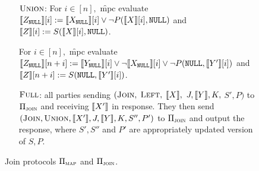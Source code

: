 \begin{figure}
{\begin{minipage}{0.95\linewidth}
\begin{enumerate}[leftmargin=.5cm]
\begin{enumerate}[leftmargin=1.1cm]
					
					\item[$\textsc{Union}$:] 
					For $i\in [n],$ \f{mpc} evaluate $\llbracket Z_\texttt{NULL}\rrbracket[i]:= \llbracket X_\texttt{NULL}\rrbracket[i] \vee \neg P(\llbracket X\rrbracket[i], \texttt{NULL})$ and $\llbracket Z\rrbracket[i]:=S(\llbracket X\rrbracket[i], \texttt{NULL})$. 
					
					For $i\in [n],$ \f{mpc} evaluate $\llbracket Z_\texttt{NULL}\rrbracket[n+i]:= \llbracket Y_\texttt{NULL}\rrbracket[i] \vee \neg \llbracket X_\texttt{NULL}\rrbracket[i] \vee \neg P(\texttt{NULL}, \llbracket Y'\rrbracket[i])$ and $\llbracket Z\rrbracket[n+i]:=S(\texttt{NULL}, \llbracket Y'\rrbracket[i])$.
					
					\item[$\textsc{Full}$:] all parties sending $(\textsc{Join},$ $\textsc{Left},$ $\llbracket X\rrbracket,$ $J, \llbracket Y\rrbracket, K,$ $S', P)$ to $\Pi_{\textsc{join}}$ and receiving $\llbracket X'\rrbracket$ in response. They then send $(\textsc{Join}, \textsc{Union}, \llbracket X'\rrbracket, J, \llbracket Y\rrbracket, K, S'', P')$  to $\Pi_{\textsc{join}}$ and output the response, where $S',S''$ and $P'$ are appropriately updated version of $S,P$.
				\end{enumerate}
				 

			\end{enumerate}
	\end{minipage}}
\vspace{-0.3cm}
	\caption{Join protocols $\Pi_{\textsc{map}}$ and $\Pi_{\textsc{join}}$.}
	\label{fig:full_proto}	
	\vspace{-0.3cm}
\end{figure}



